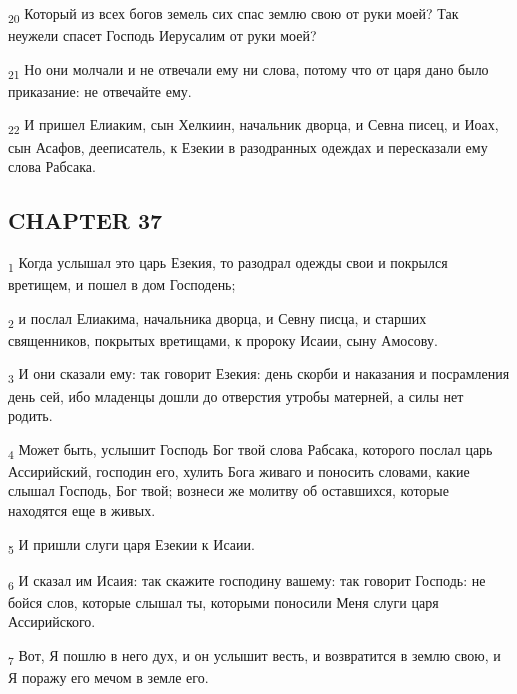 \begin{tcolorbox}
\textsubscript{20} Который из всех богов земель сих спас землю свою от руки моей? Так неужели спасет Господь Иерусалим от руки моей?
\end{tcolorbox}
\begin{tcolorbox}
\textsubscript{21} Но они молчали и не отвечали ему ни слова, потому что от царя дано было приказание: не отвечайте ему.
\end{tcolorbox}
\begin{tcolorbox}
\textsubscript{22} И пришел Елиаким, сын Хелкиин, начальник дворца, и Севна писец, и Иоах, сын Асафов, дееписатель, к Езекии в разодранных одеждах и пересказали ему слова Рабсака.
\end{tcolorbox}
\subsection{CHAPTER 37}
\begin{tcolorbox}
\textsubscript{1} Когда услышал это царь Езекия, то разодрал одежды свои и покрылся вретищем, и пошел в дом Господень;
\end{tcolorbox}
\begin{tcolorbox}
\textsubscript{2} и послал Елиакима, начальника дворца, и Севну писца, и старших священников, покрытых вретищами, к пророку Исаии, сыну Амосову.
\end{tcolorbox}
\begin{tcolorbox}
\textsubscript{3} И они сказали ему: так говорит Езекия: день скорби и наказания и посрамления день сей, ибо младенцы дошли до отверстия утробы матерней, а силы нет родить.
\end{tcolorbox}
\begin{tcolorbox}
\textsubscript{4} Может быть, услышит Господь Бог твой слова Рабсака, которого послал царь Ассирийский, господин его, хулить Бога живаго и поносить словами, какие слышал Господь, Бог твой; вознеси же молитву об оставшихся, которые находятся еще в живых.
\end{tcolorbox}
\begin{tcolorbox}
\textsubscript{5} И пришли слуги царя Езекии к Исаии.
\end{tcolorbox}
\begin{tcolorbox}
\textsubscript{6} И сказал им Исаия: так скажите господину вашему: так говорит Господь: не бойся слов, которые слышал ты, которыми поносили Меня слуги царя Ассирийского.
\end{tcolorbox}
\begin{tcolorbox}
\textsubscript{7} Вот, Я пошлю в него дух, и он услышит весть, и возвратится в землю свою, и Я поражу его мечом в земле его.
\end{tcolorbox}

